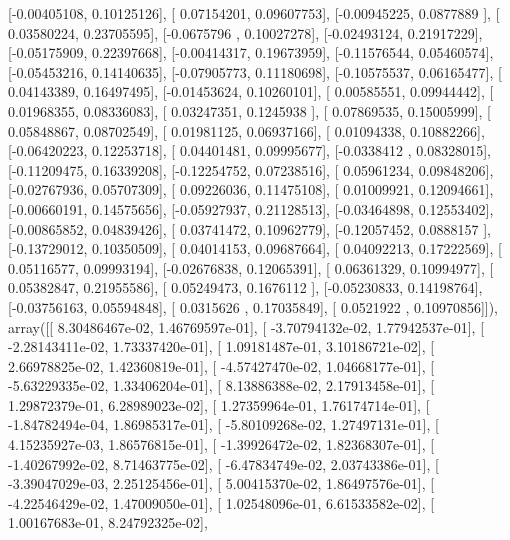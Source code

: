 \documentclass{article}
\begin{document}
       [-0.00405108,  0.10125126],
       [ 0.07154201,  0.09607753],
       [-0.00945225,  0.0877889 ],
       [ 0.03580224,  0.23705595],
       [-0.0675796 ,  0.10027278],
       [-0.02493124,  0.21917229],
       [-0.05175909,  0.22397668],
       [-0.00414317,  0.19673959],
       [-0.11576544,  0.05460574],
       [-0.05453216,  0.14140635],
       [-0.07905773,  0.11180698],
       [-0.10575537,  0.06165477],
       [ 0.04143389,  0.16497495],
       [-0.01453624,  0.10260101],
       [ 0.00585551,  0.09944442],
       [ 0.01968355,  0.08336083],
       [ 0.03247351,  0.1245938 ],
       [ 0.07869535,  0.15005999],
       [ 0.05848867,  0.08702549],
       [ 0.01981125,  0.06937166],
       [ 0.01094338,  0.10882266],
       [-0.06420223,  0.12253718],
       [ 0.04401481,  0.09995677],
       [-0.0338412 ,  0.08328015],
       [-0.11209475,  0.16339208],
       [-0.12254752,  0.07238516],
       [ 0.05961234,  0.09848206],
       [-0.02767936,  0.05707309],
       [ 0.09226036,  0.11475108],
       [ 0.01009921,  0.12094661],
       [-0.00660191,  0.14575656],
       [-0.05927937,  0.21128513],
       [-0.03464898,  0.12553402],
       [-0.00865852,  0.04839426],
       [ 0.03741472,  0.10962779],
       [-0.12057452,  0.0888157 ],
       [-0.13729012,  0.10350509],
       [ 0.04014153,  0.09687664],
       [ 0.04092213,  0.17222569],
       [ 0.05116577,  0.09993194],
       [-0.02676838,  0.12065391],
       [ 0.06361329,  0.10994977],
       [ 0.05382847,  0.21955586],
       [ 0.05249473,  0.1676112 ],
       [-0.05230833,  0.14198764],
       [-0.03756163,  0.05594848],
       [ 0.0315626 ,  0.17035849],
       [ 0.0521922 ,  0.10970856]]), array([[  8.30486467e-02,   1.46769597e-01],
       [ -3.70794132e-02,   1.77942537e-01],
       [ -2.28143411e-02,   1.73337420e-01],
       [  1.09181487e-01,   3.10186721e-02],
       [  2.66978825e-02,   1.42360819e-01],
       [ -4.57427470e-02,   1.04668177e-01],
       [ -5.63229335e-02,   1.33406204e-01],
       [  8.13886388e-02,   2.17913458e-01],
       [  1.29872379e-01,   6.28989023e-02],
       [  1.27359964e-01,   1.76174714e-01],
       [ -1.84782494e-04,   1.86985317e-01],
       [ -5.80109268e-02,   1.27497131e-01],
       [  4.15235927e-03,   1.86576815e-01],
       [ -1.39926472e-02,   1.82368307e-01],
       [ -1.40267992e-02,   8.71463775e-02],
       [ -6.47834749e-02,   2.03743386e-01],
       [ -3.39047029e-03,   2.25125456e-01],
       [  5.00415370e-02,   1.86497576e-01],
       [ -4.22546429e-02,   1.47009050e-01],
       [  1.02548096e-01,   6.61533582e-02],
       [  1.00167683e-01,   8.24792325e-02],
\end{document}
